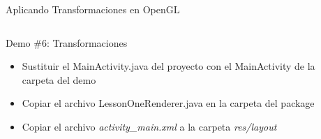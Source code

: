 \documentclass[aspectratio=169,compress]{beamer}
\begin{document}
\begin{frame}{Aplicando Transformaciones en OpenGL}
\begin{columns}
\begin{column}{0.7\textwidth}

\begin{block}{Demo \#6: Transformaciones}
\begin{itemize}
\item Sustituir el MainActivity.java del proyecto con el MainActivity de la carpeta del demo
\item Copiar el archivo LessonOneRenderer.java en la carpeta del package
\item Copiar el archivo \textit{activity\_main.xml} a la carpeta \textit{res/layout}
\end{itemize}
\end{block}
\end{column}
\begin{column}{0.3\textwidth}
\begin{center}

\end{center}
\end{column}
\end{columns}
\end{frame}
\end{document}
